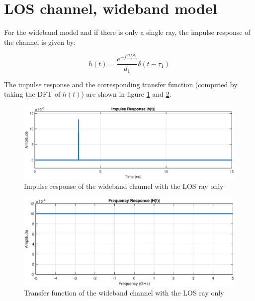 \documentclass[10pt,a4paper]{ULBreport}
\begin{document}
\section{LOS channel, wideband model}
\label{sec:LOS_channel_wideband}

For the wideband model and if there is only a single ray, the impulse response of the channel is given by:

\begin{equation*}
    h(t) = \frac{e^{-j \frac{2\pi f_cd_1}{c}}}{d_1} \delta(t - \tau_1)
\end{equation*}

The impulse response and the corresponding transfer function (computed by taking the DFT of $h(t)$) are shown in figure \ref{fig:impulse_response} and \ref{fig:transfer_function}. 

\begin{figure}[H]
    \centering
    \includegraphics[width=1\textwidth]{4_1_temp.eps}
    \caption{Impulse response of the wideband channel with the LOS ray only} 
    \label{fig:impulse_response}
\end{figure}

\begin{figure}[H]
    \centering
    \includegraphics[width=1\textwidth]{4_1_freq.eps}
    \caption{Transfer function of the wideband channel with the LOS ray only}
    \label{fig:transfer_function}
\end{figure}
\end{document}
